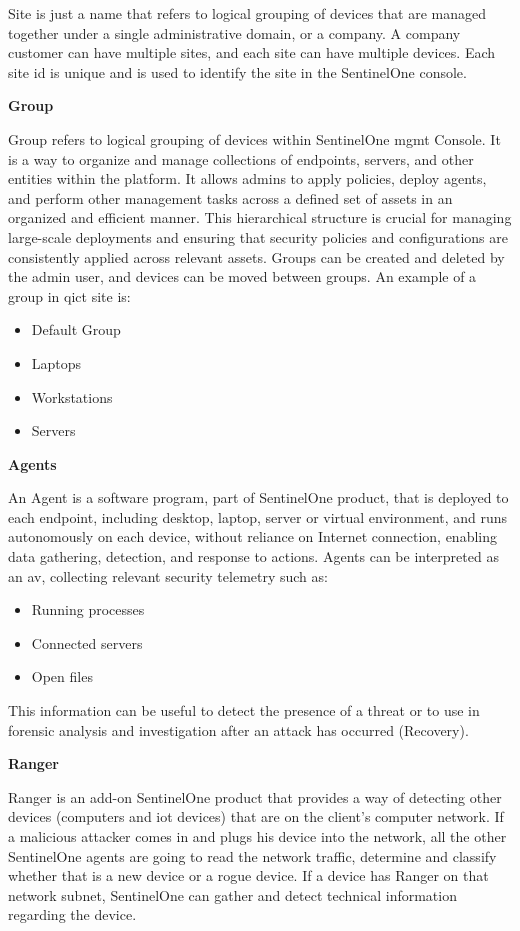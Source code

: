 Site is just a name that refers to logical grouping of devices that are managed together under a single administrative domain, or a company.
A company customer can have multiple sites, and each site can have multiple devices. Each site \acrshort{id} is unique and is used to
identify the site in the SentinelOne console.

\textbf{Group}

Group refers to logical grouping of devices within SentinelOne \acrshort{mgmt} Console.  It is a way to organize and manage collections
of endpoints, servers, and other entities within the platform. It allows admins to apply policies, deploy agents, and perform other
management tasks across a defined set of assets in an organized and efficient manner. This hierarchical structure is crucial for
managing large-scale deployments and ensuring that security policies and configurations are consistently applied across relevant assets.
Groups can be created and deleted by the admin user, and devices can be moved between groups. An example of a group in \acrshort{qict}
site is:

\begin{itemize}
      \item Default Group
      \item Laptops
      \item Workstations
      \item Servers
\end{itemize}

\textbf{Agents}

An Agent is a software program, part of SentinelOne product, that is deployed to each endpoint, including desktop, laptop,
server or virtual environment, and runs autonomously on each device, without reliance on Internet connection, enabling data
gathering, detection, and response to actions. Agents can be interpreted as an \acrshort{av}, collecting relevant security
telemetry such as:
\begin{itemize}
      \item Running processes
      \item Connected servers
      \item Open files
\end{itemize}
This information can be useful to detect the presence of a threat or to use in forensic analysis and investigation after
an attack has occurred (Recovery).

\textbf{Ranger}

Ranger is an add-on SentinelOne product that provides a way of detecting other devices (computers and
\acrshort{iot} devices) that are on the client's computer network. If a malicious attacker comes in and plugs his device
into the network, all the other SentinelOne agents are going to read the network traffic, determine and classify whether
that is a new device or a rogue device. If a device has Ranger on that network subnet, SentinelOne can gather and
detect technical information regarding the device.

